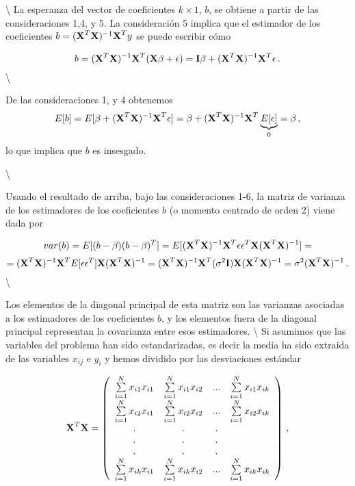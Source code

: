 \documentclass[
]{agujournal2019}
\begin{document}
\vspace{0.5cm}

 \textbackslash{}
\noindent La esperanza del vector de coeficientes \(k\times 1\), \(b\),
se obtiene a partir de las consideraciones 1,4, y 5. La consideración 5
implica que el estimador de los coeficientes
\(b=({\textbf X}^T{\textbf X})^{-1}{\textbf X}^T { y}\) se puede
escribir cómo

\[b=({\textbf X}^T{\textbf X})^{-1}{\textbf X}^T({\textbf X} \beta + \epsilon)={\textbf I}\beta +
    ({\textbf X}^T{\textbf X})^{-1}{\textbf X}^T \epsilon\,.\]
\textbackslash{}

\noindent De las consideraciones 1, y 4 obtenemos
\[E[b]=E[\beta + ({\textbf X}^T{\textbf X})^{-1}{\textbf X}^T\epsilon]=
  \beta + ({\textbf X}^T{\textbf X})^{-1}{\textbf X}^T \underbrace{E[\epsilon]}_{0}=\beta\,,\]
lo que implica que \(b\) es insesgado.

\vspace{0.5cm}

 \textbackslash{}

\noindent Usando el resultado de arriba, bajo las consideraciones 1-6,
la matriz de varianza de los estimadores de los coeficientes \(b\) (o
momento centrado de orden 2) viene dada por

\[{ var(b)}=E[(b-\beta)(b-\beta)^T]=E[({\textbf X}^T{\textbf X})^{-1}{\textbf X}^T\epsilon \epsilon^T{\textbf X}
    ({\textbf X}^T{\textbf X})^{-1}]=\]
\[=({\textbf X}^T{\textbf X})^{-1}{\textbf X}^T E[\epsilon \epsilon^T]{\textbf X}({\textbf X}^T{\textbf X})^{-1}=
({\textbf X}^T{\textbf X})^{-1}{\textbf X}^T(\sigma^2{\textbf I}){\textbf X}({\textbf X}^T{\textbf X})^{-1}=
   \sigma^2({\textbf X}^T{\textbf X})^{-1}\,.\] \textbackslash{}

\noindent Los elementos de la diagonal principal de esta matriz son las
varianzas asociadas a los estimadores de los coeficientes \(b\), y los
elementos fuera de la diagonal principal representan la covarianza entre
esos estimadores. \textbackslash{} Si asumimos que las variables del
problema han sido estandarizadas, es decir la media ha sido extraida de
las variables \(x_{ij}\) e \(y_i\) y hemos dividido por las desviaciones
estándar

\[{\textbf X}^T{\textbf X}=\left(\begin{array}{cccc}
   \sum\limits_{i=1}^N{x_{i1}x_{i1}} & \sum\limits_{i=1}^N{x_{i1}x_{i2}} & ... & \sum\limits_{i=1}^N{x_{i1}x_{ik}}\\
   \sum\limits_{i=1}^N{x_{i2}x_{i1}} & \sum\limits_{i=1}^N{x_{i2}x_{i2}} & ... & \sum\limits_{i=1}^N{x_{i2}x_{ik}}\\
        . & . & . \\
        . & . & . \\
        . & . & . \\
   \sum\limits_{i=1}^N{x_{ik}x_{i1}} & \sum\limits_{i=1}^N{x_{ik}x_{i2}} & ... & \sum\limits_{i=1}^N{x_{ik}x_{ik}}\\
        \end{array}\right)\,,\]
\end{document}
